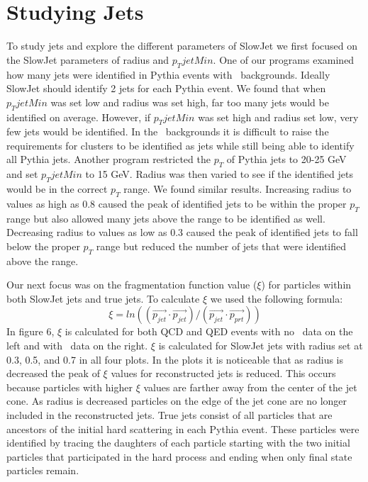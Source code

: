 \documentclass[11pt]{article}
\begin{document}
\section{Studying Jets}
%
%
To study jets and explore the different parameters of SlowJet we first focused on the SlowJet parameters of radius and $p_TjetMin$. One of our programs examined how many jets were identified in Pythia events with \trento\ backgrounds. Ideally SlowJet should identify 2 jets for each Pythia event. We found that when $p_TjetMin$ was set low and radius was set high, far too many jets would be identified on average. However, if $p_TjetMin$ was set high and radius set low, very few jets would be identified. In the \trento\ backgrounds it is difficult to raise the requirements for clusters to be identified as jets while still being able to identify all Pythia jets. Another program restricted the $p_T$ of Pythia jets to 20-25 GeV and set $p_TjetMin$ to 15 GeV. Radius was then varied to see if the identified jets would be in the correct $p_T$ range. We found similar results. Increasing radius to values as high as 0.8 caused the peak of identified jets to be within the proper $p_T$ range but also allowed many jets above the range to be identified as well. Decreasing radius to values as low as 0.3 caused the peak of identified jets to fall below the proper $p_T$ range but reduced the number of jets that were identified above the range.

Our next focus was on the fragmentation function value ($\xi$) for particles within both SlowJet jets and true jets. To calculate $\xi$ we used the following formula:
\[\xi = ln((\vec{p_{jet}} \cdot \vec{p_{jet}})/(\vec{p_{jet}} \cdot \vec{p_{prt}}))\]
In figure 6, $\xi$ is calculated for both QCD and QED events with no \trento\ data on the left and with \trento\ data on the right. $\xi$ is calculated for SlowJet jets with radius set at 0.3, 0.5, and 0.7 in all four plots. In the plots it is noticeable that as radius is decreased the peak of $\xi$ values for reconstructed jets is reduced. This occurs because particles with higher $\xi$ values are farther away from the center of the jet cone. As radius is decreased particles on the edge of the jet cone are no longer included in the reconstructed jets. True jets consist of all particles that are ancestors of the initial hard scattering in each Pythia event. These particles were identified by tracing the daughters of each particle starting with the two initial particles that participated in the hard process and ending when only final state particles remain.
\end{document}
